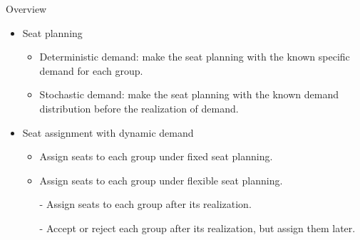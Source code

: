     \begin{frame}{Overview}
      \begin{itemize}
        \item Seat planning
        \vspace*{0.2cm}
        \begin{itemize}
          \item {\color{red}Deterministic demand}: make the seat planning with the known specific demand for each group.
          \item {\color{red}Stochastic demand}: make the seat planning with the known demand distribution before the realization of demand.
        \end{itemize}
        
        \item Seat assignment with dynamic demand
        
        \begin{itemize}
          \vspace*{0.2cm}
          \item Assign seats to each group under {\color{red}fixed} seat planning.
          \vspace*{0.2cm}
          \item Assign seats to each group under {\color{red}flexible} seat planning.
          \vspace*{0.2cm}
            \item[-] Assign seats to each group after its realization.
            \item[-] Accept or reject each group after its realization, but assign them later.
        \end{itemize}
      \end{itemize}
    \end{frame}